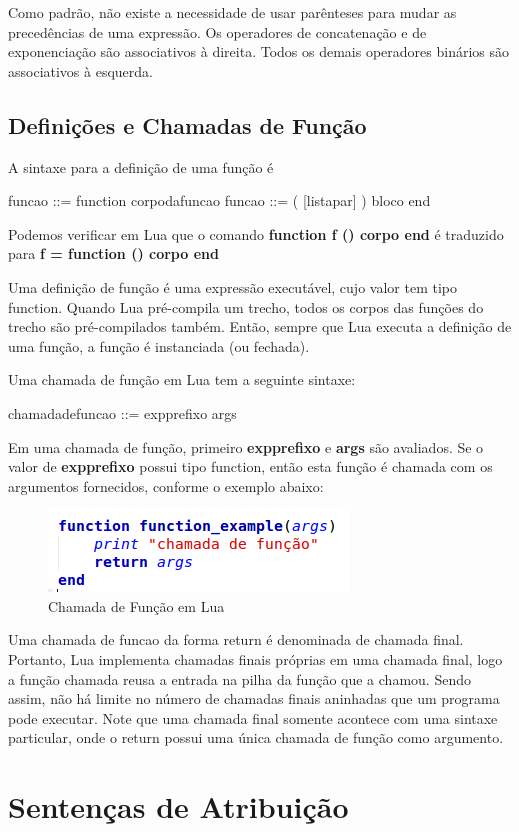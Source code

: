 \documentclass[
12pt, %
openright, %
oneside, %
a4paper, %
english, %
brazil, %
]{abntex2}
\begin{document}
Como padrão, não existe a necessidade de usar parênteses para mudar as precedências de uma expressão. Os operadores de concatenação e de exponenciação são associativos à direita. Todos os demais operadores binários são associativos à esquerda.

\section{Definições e Chamadas de Função}
A sintaxe para a definição de uma função é

  funcao ::= function corpodafuncao
  funcao ::= ( [listapar] ) bloco end

Podemos verificar em Lua que o comando \textbf{function f () corpo end} é traduzido para \textbf{f = function () corpo end}

Uma definição de função é uma expressão executável, cujo valor tem tipo function. Quando Lua pré-compila um trecho, todos os corpos das funções do trecho são pré-compilados também. Então, sempre que Lua executa a definição de uma função, a função é instanciada (ou fechada).

Uma chamada de função em Lua tem a seguinte sintaxe:

  chamadadefuncao ::= expprefixo args

Em uma chamada de função, primeiro \textbf{expprefixo} e \textbf{args} são avaliados. Se o valor de \textbf{expprefixo} possui tipo function, então esta função é chamada com os argumentos fornecidos, conforme o exemplo abaixo:

\begin{figure}[H]
\centering
\includegraphics[width=0.5\linewidth]{imagens/function.png}
\caption{Chamada de Função em Lua}
\end{figure}

Uma chamada de funcao da forma return é denominada de chamada final. Portanto, Lua implementa chamadas finais próprias em uma chamada final, logo a função chamada reusa a entrada na pilha da função que a chamou. Sendo assim, não há limite no número de chamadas finais aninhadas que um programa pode executar. Note que uma chamada final somente acontece com uma sintaxe particular, onde o return possui uma única chamada de função como argumento.

\chapter{Sentenças de Atribuição}
\end{document}
